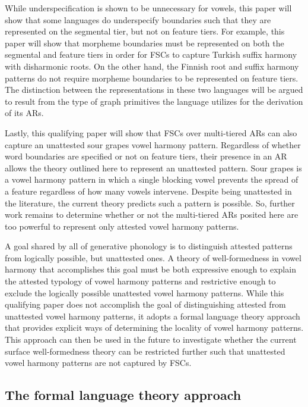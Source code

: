 \documentclass[,doc,floatsintext]{apa6}
\theoremstyle{definition}
\theoremstyle{definition}
\theoremstyle{definition}
\theoremstyle{remark}
\begin{document}
While underspecification is shown to be unnecessary for vowels, this
paper will show that some languages do underspecify boundaries such that
they are represented on the segmental tier, but not on feature tiers.
For example, this paper will show that morpheme boundaries must be
represented on both the segmental and feature tiers in order for FSCs to
capture Turkish suffix harmony with disharmonic roots. On the other
hand, the Finnish root and suffix harmony patterns do not require
morpheme boundaries to be represented on feature tiers. The distinction
between the representations in these two languages will be argued to
result from the type of graph primitives the language utilizes for the
derivation of its ARs.

Lastly, this qualifying paper will show that FSCs over multi-tiered ARs
can also capture an unattested sour grapes vowel harmony pattern.
Regardless of whether word boundaries are specified or not on feature
tiers, their presence in an AR allows the theory outlined here to
represent an unattested pattern. Sour grapes is a vowel harmony pattern
in which a single blocking vowel prevents the spread of a feature
regardless of how many vowels intervene. Despite being unattested in the
literature, the current theory predicts such a pattern is possible. So,
further work remains to determine whether or not the multi-tiered ARs
posited here are too powerful to represent only attested vowel harmony
patterns.

A goal shared by all of generative phonology is to distinguish attested
patterns from logically possible, but unattested ones. A theory of
well-formedness in vowel harmony that accomplishes this goal must be
both expressive enough to explain the attested typology of vowel harmony
patterns and restrictive enough to exclude the logically possible
unattested vowel harmony patterns. While this qualifying paper does not
accomplish the goal of distinguishing attested from unattested vowel
harmony patterns, it adopts a formal language theory approach that
provides explicit ways of determining the locality of vowel harmony
patterns. This approach can then be used in the future to investigate
whether the current surface well-formedness theory can be restricted
further such that unattested vowel harmony patterns are not captured by
FSCs.

\subsection{The formal language theory
approach}\label{the-formal-language-theory-approach}
\end{document}
